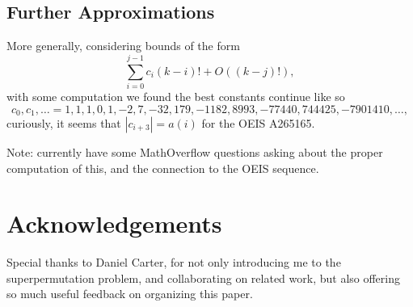 \documentclass{article}
\begin{document}
\subsection{Further Approximations} \label{comput}
More generally, considering bounds of the form
\[\sum_{i=0}^{j-1} c_i(k-i)! + O((k-j)!),\]
 with some computation we found the best constants continue like so 
\[c_0,c_1,\dots = 1,1,1,0,1,-2,7,-32,179,-1182,8993,-77440,744425,-7901410,\dots,\]
curiously, it seems that $|c_{i+3}| = a(i)$ for the OEIS A265165.

Note: currently have some MathOverflow questions asking about the proper computation of this, and the connection to the OEIS sequence.

\section{Acknowledgements}

Special thanks to Daniel Carter, for not only introducing me to the superpermutation problem, and collaborating on related work, but also offering so much useful feedback on organizing this paper.

\newpage

\appendix
\end{document}

